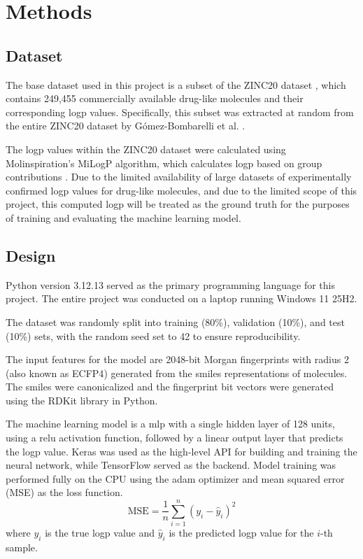 \chapter{Methods}

\section{Dataset}
The base dataset used in this project is a subset of the \gls{ZINC20} dataset \cite{zinc}, which contains 249,455 commercially available drug-like molecules and their corresponding \gls{logp} values.
Specifically, this subset was extracted at random from the entire \gls{ZINC20} dataset by G\'omez-Bombarelli et al. \cite{zinc20source}.

The \gls{logp} values within the \gls{ZINC20} dataset were calculated using Molinspiration's MiLogP algorithm, which calculates \gls{logp} based on group contributions \cite{molinspiration}.
Due to the limited availability of large datasets of experimentally confirmed \gls{logp} values for drug-like molecules, and due to the limited scope of this project, 
this computed \gls{logp} will be treated as the ground truth for the purposes of training and evaluating the machine learning model.

\section{Design}

Python \cite{python} version 3.12.13 served as the primary programming language for this project. 
The entire project was conducted on a laptop running Windows 11 25H2.

The dataset was randomly split into training (80\%), validation (10\%), and test (10\%) sets, 
with the random seed set to 42 to ensure reproducibility.

The input features for the model are 2048-bit Morgan fingerprints with radius 2 (also known as \gls{ECFP4}) generated from the \gls{smiles} representations of molecules. 
The \gls{smiles} were canonicalized and the fingerprint bit vectors were generated using the RDKit \cite{rdkit} library in Python.

The machine learning model is a \gls{mlp} with a single hidden layer of 128 units, using a \gls{relu} activation function, 
followed by a linear output layer that predicts the \gls{logp} value.
Keras \cite{keras} was used as the high-level API for building and training the neural network, while TensorFlow \cite{tensorflow} served as the backend.
Model training was performed fully on the CPU using the \gls{adam} optimizer \cite{adam} and mean squared error (MSE) as the loss function. 
\begin{equation}
    \mathrm{MSE} = \frac{1}{n} \sum_{i=1}^{n} (y_i - \hat{y}_i)^2
\end{equation}
where $y_i$ is the true \gls{logp} value and $\hat{y}_i$ is the predicted \gls{logp} value for the $i$-th sample.

